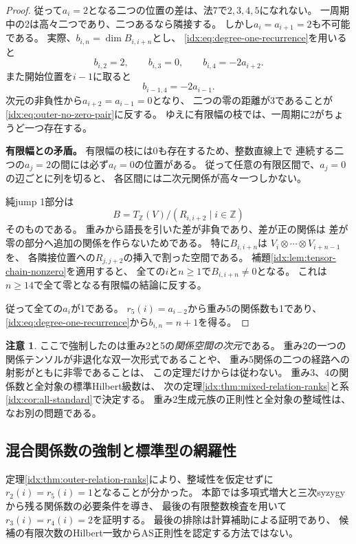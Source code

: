 \documentclass[11pt,a4paper]{ltjsarticle}
\theoremstyle{definition}
\newtheorem{remark}[theorem]{注意}
\begin{document}
\begin{proof}
従って$a_i=2$となる二つの位置の差は、法7で$2,3,4,5$になれない。
一周期中の2は高々二つであり、二つあるなら隣接する。
しかし$a_i=a_{i+1}=2$も不可能である。
実際、$b_{i,n}=\dim B_{i,i+n}$とし、
\eqref{idx:eq:degree-one-recurrence}を用いると
\[
b_{i,2}=2,\qquad b_{i,3}=0,\qquad
b_{i,4}=-2a_{i+2}.
\]
また開始位置を$i-1$に取ると
\[
b_{i-1,4}=-2a_{i-1}.
\]
次元の非負性から$a_{i+2}=a_{i-1}=0$となり、
二つの零の距離が3であることが
\eqref{idx:eq:outer-no-zero-pair}に反する。
ゆえに有限幅の枝では、一周期に2がちょうど一つ存在する。

\par\smallskip\noindent\textbf{有限幅との矛盾。}\quad
有限幅の枝には0も存在するため、整数直線上で
連続する二つの$a_j=2$の間には必ず$a_\ell=0$の位置がある。
従って任意の有限区間で、$a_j=0$の辺ごとに列を切ると、
各区間には二次元関係が高々一つしかない。

純jump 1部分は
\[
B=T_{\mathbb Z}(V)/(R_{i,i+2}\mid i\in\mathbb Z)
\]
そのものである。
重みから語長を引いた差が非負であり、差が正の関係は
差が零の部分へ追加の関係を作らないためである。
特に$B_{i,i+n}$は
$V_i\otimes\cdots\otimes V_{i+n-1}$を、
各隣接位置への$R_{j,j+2}$の挿入で割った空間である。
補題\ref{idx:lem:tensor-chain-nonzero}を適用すると、
全ての$i$と$n\geq1$で$B_{i,i+n}\ne0$となる。
これは$n\geq14$で全て零となる有限幅の結論に反する。

従って全ての$a_i$が1である。
$r_5(i)=a_{i-2}$から重み5の関係数も1であり、
\eqref{idx:eq:degree-one-recurrence}から$b_{i,n}=n+1$を得る。
\end{proof}

\begin{remark}
ここで強制したのは重み2と5の\emph{関係空間の次元}である。
重み2の一つの関係テンソルが非退化な双一次形式であることや、
重み5関係の二つの経路への射影がともに非零であることは、
この定理だけからは従わない。
重み3、4の関係数と全対象の標準Hilbert級数は、
次の定理\ref{idx:thm:mixed-relation-ranks}と系\ref{idx:cor:all-standard}で決定する。
重み2生成元族の正則性と全対象の整域性は、なお別の問題である。
\end{remark}


\subsection{混合関係数の強制と標準型の網羅性}
\label{idx:sec:mixed-relation-ranks}

定理\ref{idx:thm:outer-relation-ranks}により、整域性を仮定せずに
$r_2(i)=r_5(i)=1$となることが分かった。
本節では多項式増大と三次syzygyから残る関係数の必要条件を導き、
最後の有限整数検査を用いて$r_3(i)=r_4(i)=2$を証明する。
最後の排除は計算補助による証明であり、
候補の有限次数のHilbert一致からAS正則性を認定する方法ではない。
\end{document}
